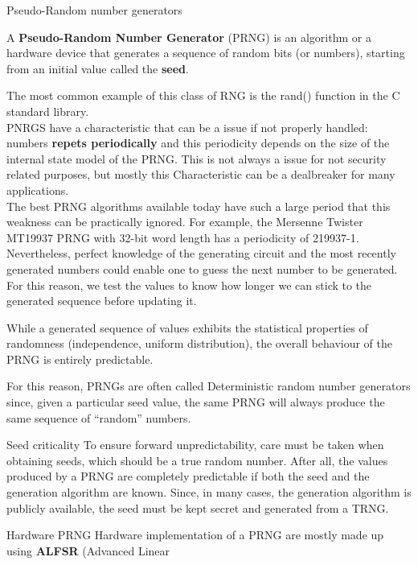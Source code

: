 \begin{section}{Pseudo-Random number generators}
  \begin{boxH}
    A \textbf{Pseudo-Random Number Generator} (PRNG) is an algorithm or a hardware device that
    generates a sequence of random bits (or numbers), starting from an initial value called the
    \textbf{seed}.
  \end{boxH}
  The most common example of this class of RNG is the rand() function in the C standard 
  library.\\
  PNRGS have a characteristic that can be a issue if not properly handled: numbers \textbf{repets periodically}
  and this periodicity depends on the size of the internal state model of the PRNG.
  This is not always a issue for not security related purposes, but mostly this Characteristic can 
  be a dealbreaker for many applications.\\
  The best PRNG algorithms available today have such a large period that this weakness can be 
  practically ignored. For example, the Mersenne Twister MT19937 PRNG with 32-bit word length has a
  periodicity of 219937-1.\\
  Nevertheless, perfect knowledge of the generating circuit and the most recently generated numbers
  could enable one to guess the next number to be generated. For this reason, we test the values to
  know how longer we can stick to the generated sequence before updating it.
  \begin{boxH}
    While a generated sequence of values exhibits the statistical properties
    of randomness (independence, uniform distribution), the overall behaviour of
    the PRNG is entirely predictable.
  \end{boxH}
  For this reason, PRNGs are often called Deterministic random number generators since, given a 
  particular seed value, the same PRNG will always produce the same sequence of “random” numbers.
  \begin{subsection}{Seed criticality}
    To ensure forward unpredictability, care must be taken when obtaining seeds, which should be a 
    true random number.
    After all, the values produced by a PRNG are completely predictable if both the seed and the
    generation algorithm are known.
    Since, in many cases, the generation algorithm is publicly available, the seed
    must be kept secret and generated from a TRNG.
  \end{subsection}
  \begin{subsection}{Hardware PRNG}
    Hardware implementation of a PRNG are mostly made up using \textbf{ALFSR} (Advanced Linear

\end{subsection}
\end{section}
